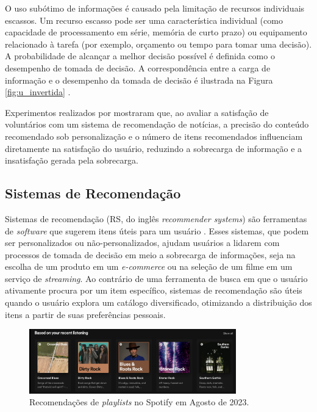 O uso subótimo de informações é causado
pela limitação de recursos individuais escassos. Um recurso escasso pode ser uma
característica individual (como capacidade de processamento em série, memória de
curto prazo) ou equipamento relacionado à tarefa (por exemplo, orçamento ou
tempo para tomar uma decisão). A probabilidade de alcançar a melhor decisão
possível é definida como o desempenho de tomada de decisão. A correspondência
entre a carga de informação e o desempenho da tomada de decisão é ilustrada na
Figura \ref{fig:u_invertida} \cite{roetzel2019information}.

Experimentos realizados por \citet{liang2006personalized} mostraram que, ao
avaliar a satisfação de voluntários com um sistema de recomendação de notícias,
a precisão do conteúdo recomendado sob personalização e o número de itens
recomendados influenciam diretamente na satisfação do usuário, reduzindo a
sobrecarga de informação e a insatisfação gerada pela sobrecarga.

\subsection{Sistemas de Recomendação}

Sistemas de recomendação (RS, do inglês \textit{recommender systems}) são
ferramentas de \textit{software} que sugerem itens úteis para um usuário
\cite{ricci2010introduction}. Esses sistemas, que podem ser personalizados ou
não-personalizados, ajudam usuários a lidarem com processos de tomada de decisão
em meio a sobrecarga de informações, seja na escolha de um produto em um
\textit{e-commerce} ou na seleção de um filme em um serviço de
\textit{streaming}. Ao contrário de uma ferramenta de busca em que o usuário
ativamente procura por um item específico, sistemas de recomendação são úteis
quando o usuário explora um catálogo diversificado, otimizando a
distribuição dos itens a partir de suas preferências pessoais.

\begin{figure}[ht]
    \centering
    \includegraphics[width=0.8\textwidth]{chapters/chap01/images/spotify.png}
    \caption{Recomendações de \textit{playlists} no Spotify em Agosto de 2023.}
    \label{fig:spotify}
\end{figure}



